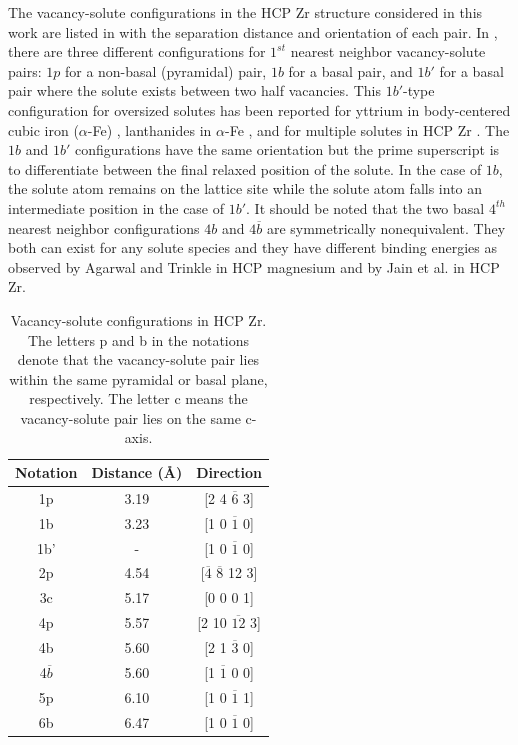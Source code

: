 \documentclass[preprint,12pt]{elsarticle}
\begin{document}
The vacancy-solute configurations in the HCP Zr structure considered in this work are listed in  with the separation distance and orientation of each pair. In , there are three different configurations for $1^{st}$ nearest neighbor vacancy-solute pairs: $1p$ for a non-basal (pyramidal) pair, $1b$ for a basal pair, and $1b'$ for a basal pair where the solute exists between two half vacancies. This $1b'$-type configuration for oversized solutes has been reported for yttrium in body-centered cubic iron ($\alpha$-Fe) \cite{bocquet_migration_2017}, lanthanides in $\alpha$-Fe \cite{yang_significant_2023}, and for multiple solutes in HCP Zr \cite{jain_first-principles_2019}. The $1b$ and $1b'$ configurations have the same orientation but the prime superscript is to differentiate between the final relaxed position of the solute. In the case of $1b$, the solute atom remains on the lattice site while the solute atom falls into an intermediate position in the case of $1b'$. It should be noted that the two basal $4^{th}$ nearest neighbor configurations $4b$ and $4\overline{b}$ are symmetrically nonequivalent. They both can exist for any solute species and they have different binding energies as observed by Agarwal and Trinkle \cite{agarwal_exact_2017} in HCP magnesium and by Jain et al. \cite{jain_first-principles_2019} in HCP Zr.



\begin{table}[h!]
    \centering
    \caption{Vacancy-solute configurations in HCP Zr. The letters p and b in the notations denote that the vacancy-solute pair lies within the same pyramidal or basal plane, respectively. The letter c means the vacancy-solute pair lies on the same c-axis.}
    \label{tab:vac-solute_distance}
    \begin{tabular}{c|c|c}
        \toprule
         Notation& Distance ({\AA})& Direction  \\
         \hline
         1p&3.19 & [2 4 $\overline{6}$ 3] \\
         1b&3.23 &[1 0 $\overline{1}$ 0] \\
         1b'& - & [1 0 $\overline{1}$ 0] \\
         2p&4.54 &[$\overline{4}$ $\overline{8}$ 12  3] \\
         3c&5.17 &[0 0 0 1] \\
         4p &5.57 &[2 10 $\overline{12}$ 3] \\
         4b&5.60 &[2 1 $\overline{3}$ 0] \\
         4$\overline{b}$&5.60 &[1 $\overline{1}$ 0 0] \\
         5p &6.10 & [1 0 $\overline{1}$ 1]\\
         6b &6.47 &[1 0 $\overline{1}$ 0] \\
         \bottomrule
    \end{tabular}
\end{table}
\end{document}
